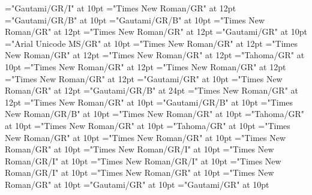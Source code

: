 \documentclass[a4paper]{article}
\begin{document}
\font\xitemxitemexamplebefore="Gautami/GR/I" at 10pt
\font\xitemxitemexamplesbefore="Times New Roman/GR" at 12pt
\font\xitemxitemheadwordbefore="Gautami/GR/B" at 10pt
\font\xitemxitemLexEntrypublishStemComponentTargetHeadWordRefbefore="Gautami/GR/B" at 10pt
\font\xitemxitemLexEntryTypepublishStemComplexFormTypeReverseAbbrPubbefore="Times New Roman/GR" at 12pt
\font\xitemxitemLexEntryTypepublishStemEntryTypeAbbreviationPubbefore="Times New Roman/GR" at 12pt
\font\xitemxitemLexSensepublishStemGlossPubLdbefore="Gautami/GR" at 10pt
\font\xitemxitemLexSensepublishStemGlossPubLebefore="Arial Unicode MS/GR" at 10pt
\font\xitemxitempartofspeechbefore="Times New Roman/GR" at 12pt
\font\xitemxitempictureLabelbefore="Times New Roman/GR" at 12pt
\font\xitemxitemprimaryrefsbefore="Times New Roman/GR" at 12pt
\font\xitemxitempronunciationbefore="Tahoma/GR" at 10pt
\font\xitemxitempronunciationsbefore="Times New Roman/GR" at 12pt
\font\sensesensesensesbefore="Times New Roman/GR" at 12pt
\font\xitemxitemtranslationbefore="Times New Roman/GR" at 12pt
\font\xitemxitemtranslationLdbefore="Gautami/GR" at 10pt
\font{}="Times New Roman/GR" at 12pt
\font{}="Gautami/GR/B" at 24pt
\font{}="Times New Roman/GR" at 12pt
\font\entryletData="Times New Roman/GR" at 10pt
\font\headwordggoTeluINentryletData="Gautami/GR/B" at 10pt
\font\spanenheadwordggoTeluINentryletData="Times New Roman/GR/B" at 10pt
\font\pronunciationsentryletData="Times New Roman/GR" at 10pt
\font\pronunciationggofonipaxemicpronunciationsentryletData="Tahoma/GR" at 10pt
\font\spanenpronunciationggofonipaxemicpronunciationsentryletData="Times New Roman/GR" at 10pt
\font\spanggofonipaxemicpronunciationggofonipaxemicpronunciationsentryletData="Tahoma/GR" at 10pt
\font\spanenpronunciationsentryletData="Times New Roman/GR" at 10pt
\font\sensesentryletData="Times New Roman/GR" at 10pt
\font\sensesensesentryletData="Times New Roman/GR" at 10pt
\font\grammaticalinfosensesensesentryletData="Times New Roman/GR/I" at 10pt
\font\partofspeechengrammaticalinfosensesensesentryletData="Times New Roman/GR/I" at 10pt
\font\spanenpartofspeechengrammaticalinfosensesensesentryletData="Times New Roman/GR/I" at 10pt
\font\spanengrammaticalinfosensesensesentryletData="Times New Roman/GR/I" at 10pt
\font{}="Times New Roman/GR" at 10pt
\font\spanendefinitionensensesensesentryletData="Times New Roman/GR" at 10pt
\font\LexSensepublishStemGlossPubLdtesensesensesentryletData="Gautami/GR" at 10pt
\font\spanteLexSensepublishStemGlossPubLdtesensesensesentryletData="Gautami/GR" at 10pt
\end{document}
